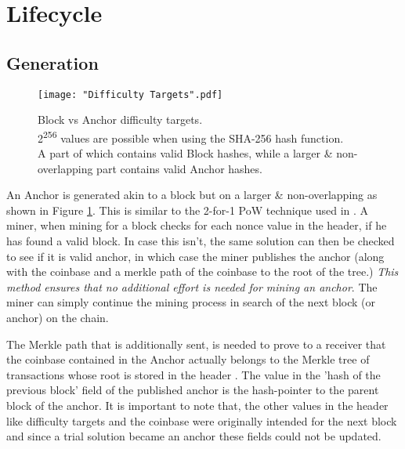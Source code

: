 
\section{Lifecycle}

\subsection{Generation} \label{anc-gen}

\begin{figure}[!htb]
    \centering
	\texttt{[image: "Difficulty Targets".pdf]}
    \caption[Block vs Anchor difficulty targets]{
        Block vs Anchor difficulty targets.\\
        \footnotesize
        2\textsuperscript{256} values are possible when using the SHA-256 hash function. \\
        A part of which contains valid Block hashes, while a larger \& non-overlapping part contains valid Anchor hashes.
    }
    \label{fig-targets}
\end{figure}

An Anchor is generated akin to a block but on a larger \& non-overlapping as shown in Figure \ref{fig-targets}.
This is similar to the 2-for-1 PoW technique used in \cite{backboneprotocol, fruitchain, prism}.
A miner, when mining for a block checks for each nonce value in the header, if he has found a valid block.
In case this isn't, the same solution can then be checked to see if it is valid anchor, in which case the miner publishes the anchor (along with the coinbase and a merkle path of the coinbase to the root of the tree.) 
{\em This method ensures that no additional effort is needed for mining an anchor}. 
The miner can simply continue the mining process in search of the next block (or anchor) on the chain. 


The Merkle path that is additionally sent, is needed to prove to a receiver that the coinbase contained in the Anchor actually belongs to the Merkle tree of transactions whose root is stored in the header \cite{bitcoinOriginal}. 
The value in the 'hash of the previous block' field of the published anchor is the hash-pointer to the parent block of the anchor. 
It is important to note that, the other values in the header like difficulty targets and the coinbase were originally intended for the next block and since a trial solution became an anchor these fields could not be updated. 

